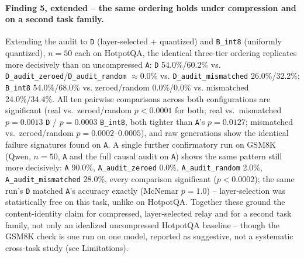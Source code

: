 \documentclass[11pt]{article}
\begin{document}
\paragraph{Finding 5, extended -- the same ordering holds under
compression and on a second task family.} Extending the audit to
\texttt{D} (layer-selected + quantized) and \texttt{B\_int8} (uniformly
quantized), $n=50$ each on HotpotQA, the identical three-tier ordering
replicates more decisively than on uncompressed \texttt{A}: \texttt{D}
54.0\%/60.2\% vs. \texttt{D\_audit\_zeroed}/\texttt{D\_audit\_random}
$\approx$0.0\% vs. \texttt{D\_audit\_mismatched} 26.0\%/32.2\%;
\texttt{B\_int8} 54.0\%/68.0\% vs. zeroed/random 0.0\%/0.0\% vs.
mismatched 24.0\%/34.4\%. All ten pairwise comparisons across both
configurations are significant (real vs.\ zeroed/random $p<0.0001$ for
both; real vs.\ mismatched $p=0.0013$ \texttt{D} / $p=0.0003$
\texttt{B\_int8}, both tighter than \texttt{A}'s $p=0.0127$; mismatched
vs.\ zeroed/random $p=0.0002$--$0.0005$), and raw generations show the
identical failure signatures found on \texttt{A}. A single further
confirmatory run on GSM8K \citep{gsm8k2021} (Qwen, $n=50$, \texttt{A} and
the full causal audit on \texttt{A}) shows the same pattern still more
decisively: \texttt{A} 90.0\%, \texttt{A\_audit\_zeroed} 0.0\%,
\texttt{A\_audit\_random} 2.0\%, \texttt{A\_audit\_mismatched} 28.0\%,
every comparison significant ($p<0.0002$); the same run's \texttt{D}
matched \texttt{A}'s accuracy exactly (McNemar $p=1.0$) --
layer-selection was statistically free on this task, unlike on HotpotQA.
Together these ground the content-identity claim for compressed,
layer-selected relay and for a second task family, not only an idealized
uncompressed HotpotQA baseline -- though the GSM8K check is one run on one
model, reported as suggestive, not a systematic cross-task study (see
Limitations).
\end{document}
